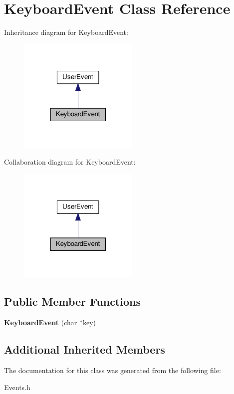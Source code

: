 \hypertarget{classKeyboardEvent}{}\section{Keyboard\+Event Class Reference}
\label{classKeyboardEvent}


Inheritance diagram for Keyboard\+Event\+:\nopagebreak
\begin{figure}[H]
\begin{center}
\leavevmode
\includegraphics[width=163pt]{classKeyboardEvent__inherit__graph}
\end{center}
\end{figure}


Collaboration diagram for Keyboard\+Event\+:\nopagebreak
\begin{figure}[H]
\begin{center}
\leavevmode
\includegraphics[width=163pt]{classKeyboardEvent__coll__graph}
\end{center}
\end{figure}
\subsection*{Public Member Functions}
\begin{DoxyCompactItemize}
\item 
\mbox{\label{classKeyboardEvent_ace85ab376330592de539542e0b190d53}} 
{\bfseries Keyboard\+Event} (char $\ast$key)
\end{DoxyCompactItemize}
\subsection*{Additional Inherited Members}


The documentation for this class was generated from the following file\+:\begin{DoxyCompactItemize}
\item 
Events.\+h\end{DoxyCompactItemize}
